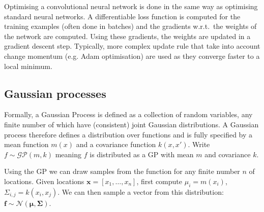 \documentclass{article}
\begin{document}
Optimising a convolutional neural network is done in the same way as optimising standard neural networks. A differentiable loss function is computed for the training examples (often done in batches) and the gradients w.r.t.\ the weights of the network are computed. Using these gradients, the weights are updated in a gradient descent step. Typically, more complex update rule that take into account change momentum (e.g. Adam optimisation\cite{adam}) are used as they converge faster to a local minimum. 

\subsection{Gaussian processes}
Formally, a Gaussian Process is defined as a collection of random variables, any finite number of which have (consistent) joint Gaussian distributions. A Gaussian process therefore defines a distribution over functions and is fully specified by a mean function $m(x)$ and a covariance function $k(x, x')$. Write $f \sim \mathcal{GP}(m, k)$ meaning $f$ is distributed as a GP with mean $m$ and covariance $k$.

Using the GP we can draw samples from the function for any finite number $n$ of locations. Given locations $\mathbf{x} = [x_1, \dots, x_n]$, first compute $\mu_i = m(x_i)$, $\Sigma_{i,j} = k(x_i, x_j)$. We can then sample a vector from this distribution: $\mathbf{f} \sim \mathcal{N}(\mathbf{\mu}, \mathbf{\Sigma})$.
\end{document}
